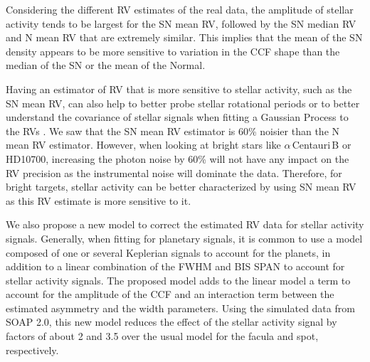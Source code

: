 \documentclass{aa}
\newcommand{\jessi}[1]{{\color{Purple}[[\textbf{Jessi: }#1]]}}
\newcommand{\xavier}[1]{{\color{blue}[[\textbf{Xavier: }#1]]}}
\newcommand{\umberto}[1]{{\color{green}[[\textbf{Umberto: }#1]]}}
\begin{document}
Considering the different RV estimates of the real data, the amplitude of stellar activity tends to be largest for the SN mean RV, followed by the SN median RV and N mean RV that are extremely similar. 
This implies that the mean of the SN density appears to be more sensitive to variation in the CCF shape than the median of the SN or the mean of the Normal.  

Having an estimator of RV that is more sensitive to stellar activity, such as the SN mean RV, can also help to better probe stellar rotational periods or to better understand the covariance of stellar signals when fitting a Gaussian Process to the RVs \citep[e.g.][]{Faria-2016a, Haywood-2014}. 
We saw that the SN mean RV estimator is 60\% noisier than the N mean RV estimator. 
However, when looking at bright
stars like $\alpha$\,Centauri\,B or HD10700, increasing the photon noise by 60\% will not have any impact
on the RV precision as the instrumental noise will dominate the data. Therefore, for bright targets, stellar activity 
can be better characterized by using SN mean RV as this RV estimate is more sensitive to it.
%


We also propose a new model to correct the estimated RV data for stellar activity signals. 
Generally, when fitting for planetary signals, it is common to use a model composed of one or several Keplerian signals to account for the planets, in addition to a linear combination of the FWHM and BIS SPAN to account for stellar activity signals. 
The proposed model adds to the linear model a term to account for the amplitude of the CCF and an interaction term between the estimated asymmetry and the width parameters. 
Using the simulated data from SOAP 2.0, this new model reduces the effect of the stellar activity signal by factors of about 2 and 3.5 over the usual model for the facula and spot, respectively.
\end{document}

